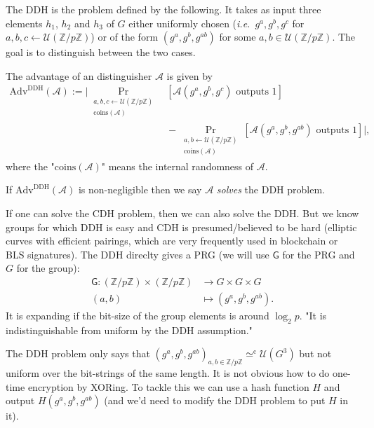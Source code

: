 \documentclass[./main]{subfiles}
\begin{document}
  \begin{defn}
    The DDH is the problem defined by the following.
    It takes as input three elements $h_1$, $h_2$ and $h_3$ of $G$ either uniformly chosen (\textit{i.e.}\ $g^a, g^b, g^c$ for  $a,b,c \gets \mathcal{U}(\mathds{Z} / p \mathds{Z})$) or of the form $(g^a, g^b, g^{ab})$ for some $a,b \in \mathcal{U}(\mathds{Z} / p \mathds{Z})$.
    The goal is to distinguish between the two cases.

    The advantage of an distinguisher $\mathcal{A}$ is given by 
    \begin{align*}
      \mathrm{Adv}^\mathrm{DDH}(\mathcal{A}) := \Big| \Pr_{\substack{a, b, c \gets \mathcal{U}(\mathds{Z} / p \mathds{Z})\\ \mathrm{coins}(\mathcal{A})}}&[\mathcal{A}(g^a, g^b, g^c) \text{ outputs } 1]\\
        &{}- \Pr_{\substack{a, b \gets \mathcal{U}(\mathds{Z} / p \mathds{Z})\\ \mathrm{coins}(\mathcal{A})}}[\mathcal{A}(g^a, g^b, g^{ab}) \text{ outputs } 1]
      \Big|
    ,\end{align*}
    where the "$\mathrm{coins}(\mathcal{A})$" means the internal randomness of $\mathcal{A}$.

    If $\mathrm{Adv}^\mathrm{DDH}(\mathcal{A})$ is non-negligible then we say $\mathcal{A}$  \textit{solves} the DDH problem.
  \end{defn}

  If one can solve the CDH problem, then we can also solve the DDH.
  But we know groups for which DDH is easy and CDH is presumed/believed to be hard (elliptic curves with efficient pairings, which are very frequently used in blockchain or BLS signatures).
  The DDH direclty gives a PRG (we will use $\mathsf{G}$ for the PRG and $G$ for the group):
  \begin{align*}
    \mathsf{G}: (\mathds{Z} / p \mathds{Z}) \times (\mathds{Z} / p \mathds{Z}) &\longrightarrow G \times G \times G \\
    (a,b) &\longmapsto (g^a, g^b, g^{ab})
  .\end{align*}
  It is expanding if the bit-size of the group elements is around $\log_2 p$.
  "It is indistinguishable from uniform by the DDH assumption."

  The DDH problem only says that $(g^a, g^b, g^{ab})_{a,b \in \mathds{Z} / p \mathds{Z}} \simeq^\mathrm{c} \mathcal{U}(G^3)$ but not uniform over the bit-strings of the same length.
  It is not obvious  how to do one-time encryption by XORing.
  To tackle this we can use a hash function $H$ and output $H(g^a, g^b, g^{ab})$ (and we'd need to modify the DDH problem to put $H$ in it).
\end{document}
